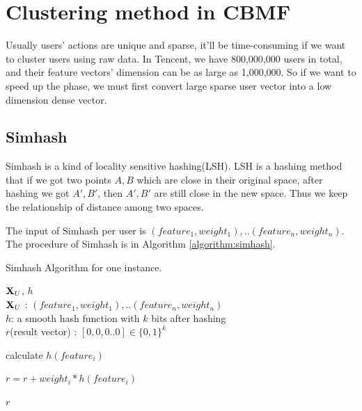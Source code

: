 \section{Clustering method in CBMF}

Usually users' actions are unique and sparse, it'll be time-consuming if we want to cluster users using raw data. In Tencent, we have 800,000,000 users in total, and their feature vectors’ dimension can be as large as 1,000,000. So if we want to speed up the phase, we must first convert large sparse user vector into a low dimension dense vector.

\subsection{Simhash}

Simhash is a kind of locality sensitive hashing(LSH). LSH is a hashing method that if we got two points $A,B$ which are close in their original space, after hashing we got $A',B'$, then $A',B'$ are still close in the new space. Thus we keep the relationship of distance among two spaces. 

The input of Simhash per user is $(feature_1, weight_1),..(feature_n,weight_n)$. The procedure of Simhash is in Algorithm \ref{algorithm:simhash}.

\begin{algorithm}[tb]
\caption{Simhash Algorithm for one instance.}
\begin{algorithmic}

 $\mathbf{X}_U$, $h$\\
$\mathbf{X}_{U}$ : $(feature_1, weight_1),..(feature_n,weight_n)$ \\
$h$: a smooth hash function with $k$ bits after hashing\\

 $r$(result vector) : $[0,0,0..0] \in \{0,1\}^k$


\STATE calculate $h(feature_i)$

\STATE $r = r + weight_i * h(feature_i)$

\ENDFOR

\ELSE 
{}
\ENDIF
\ENDFOR

 $r$

\end{algorithmic}
\label{algorithm:simhash}
\end{algorithm}

